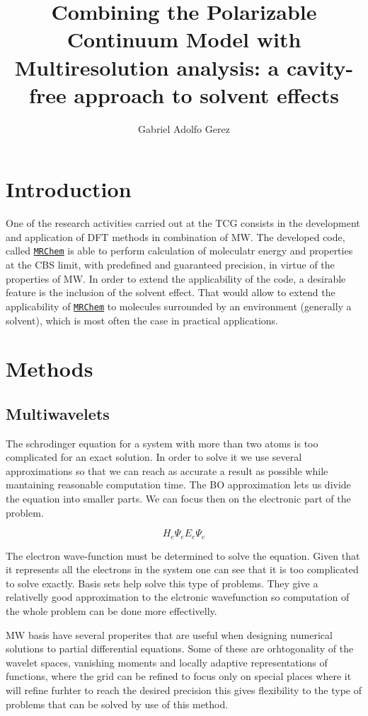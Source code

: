 \documentclass[a4paper,11pt]{article}
\title{Combining the Polarizable Continuum Model with Multiresolution
  analysis: a cavity-free approach to solvent effects}
\author{Gabriel Adolfo Gerez}
\newcommand{\mrchem}{\href{https://mrchem.readthedocs.io/en/latest/}{\texttt{MRChem}}}
\begin{document}
\maketitle

\section{Introduction}

One of the research activities carried out at the \ac{TCG} consists in
the development and application of \ac{DFT} methods in combination of
\ac{MW}. The developed code, called \mrchem{} is able to perform calculation of
moleculatr energy and properties at the \ac{CBS} limit, with
predefined and guaranteed precision, in virtue of the properties of
\ac{MW}. In order to extend the applicability of the code, a desirable
feature is the inclusion of the solvent effect. That would allow to
extend the applicability of \mrchem{} to molecules surrounded by an
environment (generally a solvent), which is most often the case in
practical applications.

\section{Methods}

\subsection{Multiwavelets}
The schrodinger equation for a system with more than two atoms is too complicated for an exact solution. In order to solve it we use several approximations so that we can reach as accurate a result as possible while mantaining reasonable computation time.
The \ac{BO} approximation lets us divide the equation into smaller parts. We can focus then on the electronic part of the problem.

\begin{equation}
H_e \Psi_e E_e \Psi_e
\end{equation}

 The electron wave-function must be determined to solve the equation. Given that it represents all the electrons in the system one can see that it is too complicated to solve exactly. Basis sets help solve this type of problems. They give a relativelly good approximation to the elctronic wavefunction so computation of the whole problem can be done more effectivelly.
 

\ac{MW} basis have several properites that are useful when designing numerical solutions to partial differential equations. Some of these are orhtogonality of the wavelet spaces, vanishing moments
and locally adaptive representations of functions, where the grid can be refined to focus only on special places where it will refine furhter to reach the desired precision %
this gives flexibility to the type of problems that can be solved by use of this method.
\end{document}
